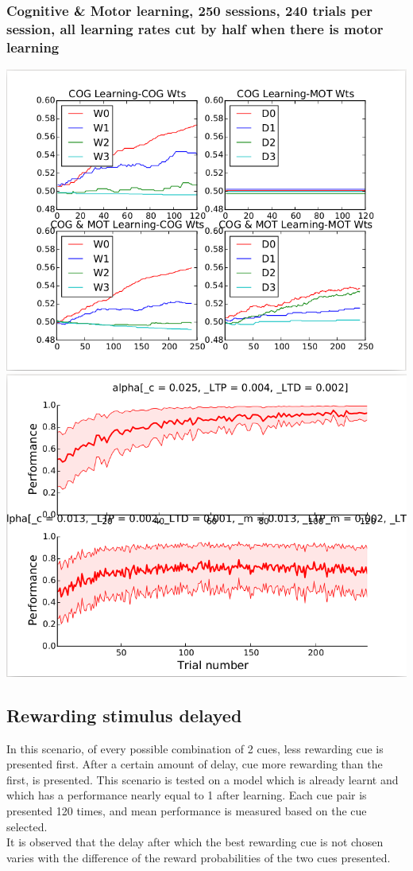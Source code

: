 \documentclass[11pt]{article}
\begin{document}
\subsubsection{Cognitive \& Motor learning, 250 sessions, 240 trials per session, all learning rates cut by half when there is motor learning}
\includegraphics[clip=true, trim=15 15 0 15, scale=.5]{weights_diff_rates.png}
\includegraphics[clip=true, trim=15 15 0 15, scale=.5]{perf_diff_rates.png}

\subsection{Rewarding stimulus delayed}
In this scenario, of every possible combination of 2 cues, less rewarding cue is presented first. After a certain amount of delay, cue more rewarding than the first, is presented. This scenario is tested on a model which is already learnt and which has a performance nearly equal to 1 after learning. Each cue pair is presented 120 times, and mean performance is measured based on the cue selected.
\\
It is observed that the delay after which the best rewarding cue is not chosen varies with the difference of the reward probabilities of the two cues presented.
\end{document}
